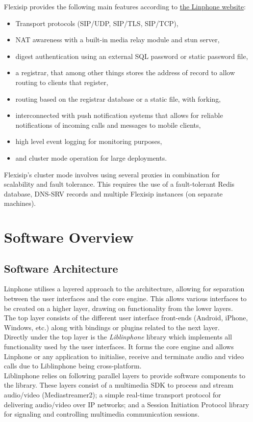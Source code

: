 \documentclass[11pt]{article}
\begin{document}
Flexisip provides the following main features according to \href{www.linphone.org}{the Linphone website}:
\begin{itemize}
\item Transport protocols (SIP/UDP, SIP/TLS, SIP/TCP),
\item NAT awareness with a built-in media relay module and stun server,
\item digest authentication using an external SQL password or static password file,
\item a registrar, that among other things stores the address of record to allow routing to clients that register,
\item routing based on the registrar database or a static file, with forking,
\item interconnected with push notification systems that allows for reliable notifications of incoming calls and messages to mobile clients,
\item high level event logging for monitoring purposes,
\item and cluster mode operation for large deployments.
\end{itemize}

Flexisip's cluster mode involves using several proxies in combination for scalability and fault tolerance. This requires the use of a fault-tolerant Redis database, DNS-SRV records and multiple Flexisip instances (on separate  machines).

\section{Software Overview}
\subsection{Software Architecture}
Linphone utilises a layered approach to the architecture, allowing for separation between the user interfaces and the core engine. This allows various interfaces to be created on a higher layer, drawing on functionality from the lower layers.
\\
The top layer consists of the different user interface front-ends (Android, iPhone, Windows, etc.) along with bindings or plugins related to the next layer.
\\
Directly under the top layer is the \textit{Liblinphone} library which implements all functionality used by the user interfaces. It forms the core engine and allows Linphone or any application to initialise, receive and terminate audio and video calls due to Liblinphone being cross-platform.
\\
Liblinphone relies on following parallel layers to provide software components to the library. These layers consist of a multimedia SDK to process and stream audio/video (Mediastreamer2); a simple real-time transport protocol for delivering audio/video over IP networks; and a Session Initiation Protocol library for signaling and controlling multimedia communication sessions.
\end{document}
